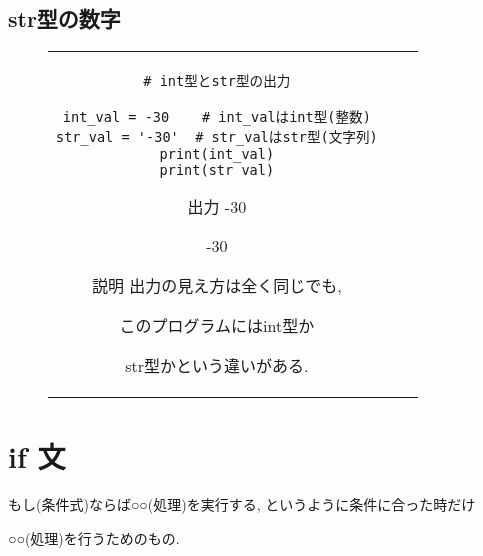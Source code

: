\documentclass{jsarticle}
\begin{document}
\subsection{str型の数字} \vspace{-5mm}
\begin{figure}[h]
	\begin{tabular}{ccc}
		\begin{minipage}[t]{.45\textwidth}
			\begin{lstlisting}[caption=int型とstr型]
# int型とstr型の出力

int_val = -30    # int_valはint型(整数)
str_val = '-30'  # str_valはstr型(文字列)
print(int_val)
print(str_val)
\end{lstlisting}
		\end{minipage} \hspace{5mm}
		\begin{minipage}[t]{.1\textwidth}
			\begin{itembox}[l]{出力}
				-30 \par
				-30
			\end{itembox}
		\end{minipage} \hspace{5mm}
		\begin{minipage}[t]{.35\textwidth}
			\begin{itembox}[l]{説明}
				出力の見え方は全く同じでも, \par このプログラムにはint型か\par str型かという違いがある.
			\end{itembox}
		\end{minipage}
	\end{tabular}
\end{figure}


\section{if 文}
もし(条件式)ならば○○(処理)を実行する, というように条件に合った時だけ \par ○○(処理)を行うためのもの.
\end{document}
